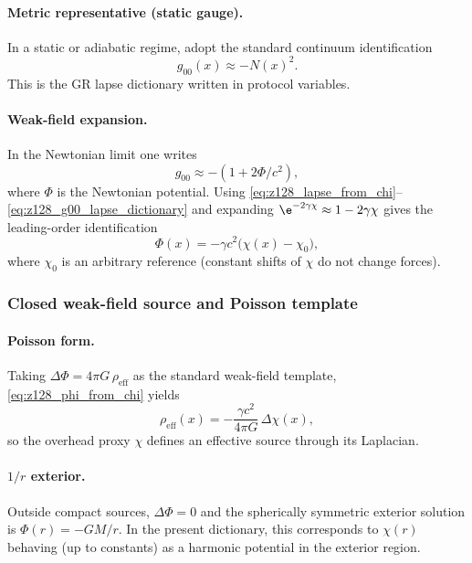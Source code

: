 \paragraph{Metric representative (static gauge).}
\InterfaceTag In a static or adiabatic regime, adopt the standard continuum identification
\begin{equation}
\label{eq:z128_g00_lapse_dictionary}
g_{00}(x)\approx -N(x)^2.
\end{equation}
This is the GR lapse dictionary written in protocol variables.

\paragraph{Weak-field expansion.}
\InterfaceTag In the Newtonian limit one writes
\[
g_{00}\approx -(1+2\Phi/c^2),
\]
where $\Phi$ is the Newtonian potential.
Using \eqref{eq:z128_lapse_from_chi}--\eqref{eq:z128_g00_lapse_dictionary} and expanding $\e^{-2\gamma\chi}\approx 1-2\gamma\chi$ gives the leading-order identification
\begin{equation}
\label{eq:z128_phi_from_chi}
\Phi(x)= -\gamma c^2\bigl(\chi(x)-\chi_0\bigr),
\end{equation}
where $\chi_0$ is an arbitrary reference (constant shifts of $\chi$ do not change forces).

\subsubsection{Closed weak-field source and Poisson template}
\label{subsec:z128_poisson_template}

\paragraph{Poisson form.}
\InterfaceTag Taking $\Delta\Phi=4\pi G\,\rho_{\mathrm{eff}}$ as the standard weak-field template, \eqref{eq:z128_phi_from_chi} yields
\begin{equation}
\label{eq:z128_rho_eff_from_chi}
\rho_{\mathrm{eff}}(x)=-\frac{\gamma c^2}{4\pi G}\,\Delta\chi(x),
\end{equation}
so the overhead proxy $\chi$ defines an effective source through its Laplacian.

\paragraph{\texorpdfstring{$1/r$}{1/r} exterior.}
\InterfaceTag Outside compact sources, $\Delta\Phi=0$ and the spherically symmetric exterior solution is $\Phi(r)=-GM/r$.
In the present dictionary, this corresponds to $\chi(r)$ behaving (up to constants) as a harmonic potential in the exterior region.

